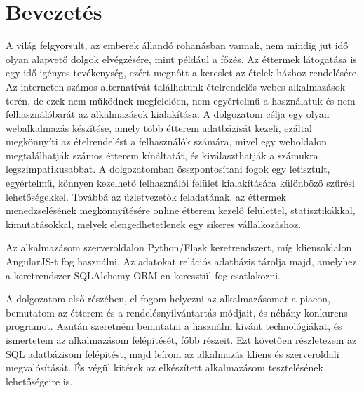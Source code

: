 \chapter{Bevezetés}

A világ felgyorsult, az emberek állandó rohanásban vannak, nem mindig jut idő olyan alapvető dolgok elvégzésére, mint például a főzés. Az éttermek látogatása is egy idő igényes tevékenység, ezért megnőtt a kereslet az ételek házhoz rendelésére. Az interneten számos alternatívát találhatunk ételrendelős webes alkalmazások terén, de ezek nem működnek megfelelően, nem egyértelmű a használatuk és nem felhasználóbarát az alkalmazások kialakítása. A dolgozatom célja egy olyan webalkalmazás készítése, amely több étterem adatbázisát kezeli, ezáltal megkönnyíti az ételrendelést a felhasználók számára, mivel egy weboldalon megtalálhatják számos étterem kínáltatát, és kiválaszthatják a számukra legszimpatikusabbat. A dolgozatomban összpontosítani fogok egy letisztult, egyértelmű, könnyen kezelhető felhasználói felület kialakítására különböző szűrési lehetőségekkel. Továbbá az üzletvezetők feladatának, az éttermek menedzselésének megkönnyítésére online étterem kezelő felülettel, statisztikákkal, kimutatásokkal, melyek elengedhetetlenek egy sikeres vállalkozáshoz.

Az alkalmazásom szerveroldalon Python/Flask keretrendszert, míg kliensoldalon AngularJS-t fog használni. Az adatokat relációs adatbázis tárolja majd, amelyhez a keretrendszer SQLAlchemy ORM-en keresztül fog csatlakozni.

A dolgozatom első részében, el fogom helyezni az alkalmazásomat a piacon, bemutatom az étterem és a rendelésnyilvántartás módjait, és néhány konkurens programot. Azután szeretném bemutatni a használni kívánt technológiákat, és ismertetem az alkalmazásom felépítését, főbb részeit. Ezt követően részletezem az SQL adatbázisom felépítést, majd leírom az alkalmazás kliens és szerveroldali megvalósítását. És végül kitérek az elkészített alkalmazásom tesztelésének lehetőségeire is.
